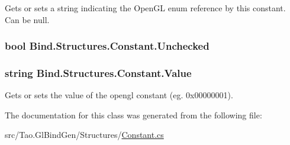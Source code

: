 Gets or sets a string indicating the OpenGL enum reference by this constant. Can be null. 

\hypertarget{class_bind_1_1_structures_1_1_constant_a7b35ed6fa483e43f1799d37724d0b173}{
\subsubsection[{Unchecked}]{\setlength{\rightskip}{0pt plus 5cm}bool Bind.Structures.Constant.Unchecked}}
\label{class_bind_1_1_structures_1_1_constant_a7b35ed6fa483e43f1799d37724d0b173}
\hypertarget{class_bind_1_1_structures_1_1_constant_a17084b59dd24e9b609bd6d99d02c032e}{
\subsubsection[{Value}]{\setlength{\rightskip}{0pt plus 5cm}string Bind.Structures.Constant.Value}}
\label{class_bind_1_1_structures_1_1_constant_a17084b59dd24e9b609bd6d99d02c032e}


Gets or sets the value of the opengl constant (eg. 0x00000001). 



The documentation for this class was generated from the following file:\begin{DoxyCompactItemize}
\item 
src/Tao.GlBindGen/Structures/\hyperlink{_constant_8cs}{Constant.cs}\end{DoxyCompactItemize}

